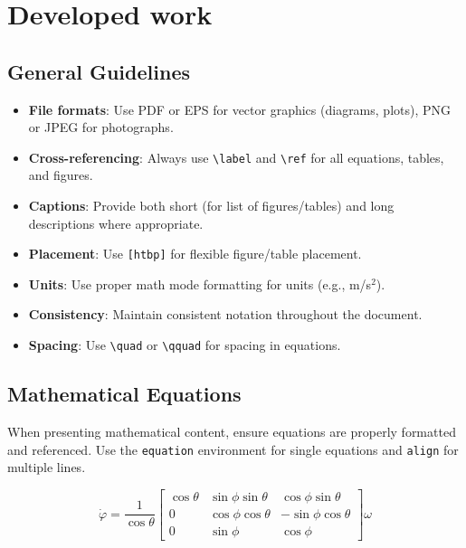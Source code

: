 \chapter{Developed work}%
\label{chap:developed-work}

\section{General Guidelines}
\label{sec:guidelines}

\begin{itemize}
    \item \textbf{File formats}: Use PDF or EPS for vector graphics (diagrams, plots), PNG or JPEG for photographs.
    \item \textbf{Cross-referencing}: Always use \texttt{\textbackslash label} and \texttt{\textbackslash ref} for all equations, tables, and figures.
    \item \textbf{Captions}: Provide both short (for list of figures/tables) and long descriptions where appropriate.
    \item \textbf{Placement}: Use \texttt{[htbp]} for flexible figure/table placement.
    \item \textbf{Units}: Use proper math mode formatting for units (e.g., m/s$^2$).
    \item \textbf{Consistency}: Maintain consistent notation throughout the document.
    \item \textbf{Spacing}: Use \texttt{\textbackslash quad} or \texttt{\textbackslash qquad} for spacing in equations.
\end{itemize}

\section{Mathematical Equations}
\label{sec:equations}

When presenting mathematical content, ensure equations are properly formatted and referenced. Use the \texttt{equation} environment for single equations and \texttt{align} for multiple lines.

\begin{equation}
    \label{eq:rotation-matrix}
    \dot{\varphi} = \frac{1}{\cos{\theta}} 
    \begin{bmatrix}
        \cos\theta & \sin\phi \sin\theta & \cos\phi \sin\theta \\
        0          & \cos\phi \cos\theta & -\sin\phi \cos\theta \\
        0          & \sin\phi             & \cos\phi
    \end{bmatrix} \omega
\end{equation}

